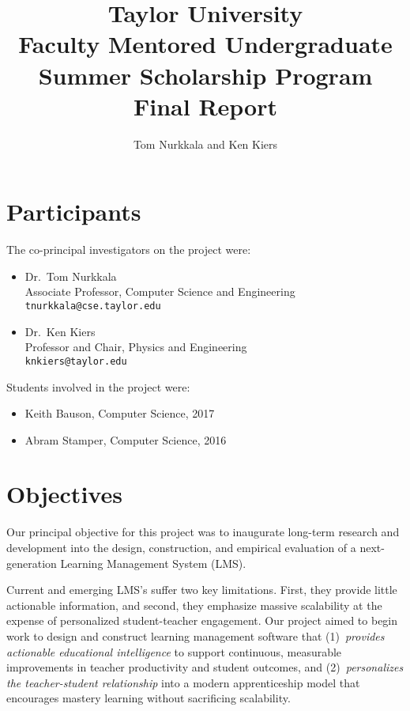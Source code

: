 \documentclass{article}
\title{Taylor University\\
  Faculty Mentored Undergraduate\\
  Summer Scholarship Program\\
  Final Report}
\author{Tom Nurkkala and Ken Kiers}
\begin{document}
\maketitle


\section{Participants}
\label{sec:participants}

The co-principal investigators on the project were:
\begin{itemize}
\item Dr.\ Tom Nurkkala\\
  Associate Professor, Computer Science and Engineering\\
  \texttt{tnurkkala@cse.taylor.edu}
\item Dr.\ Ken Kiers\\
  Professor and Chair, Physics and Engineering\\
  \texttt{knkiers@taylor.edu}
\end{itemize}
Students involved in the project were:
\begin{itemize}
\item Keith Bauson, Computer Science, 2017
\item Abram Stamper, Computer Science, 2016
\end{itemize}

\section{Objectives}
\label{sec:objectives}

Our principal objective for this project was
to inaugurate long-term research and development
into the design, construction, and empirical evaluation
of a next-generation Learning Management System (LMS).

Current and emerging LMS's
suffer two key limitations.
First, they provide little actionable information,
and second, they emphasize massive scalability
at the expense of
personalized student-teacher engagement.
Our project aimed to begin work to
design and construct
learning management software
that
(1)~\emph{provides actionable educational intelligence}
to support continuous, measurable improvements
in teacher productivity and student outcomes, and
(2)~\emph{personalizes the  teacher-student relationship}
into a modern apprenticeship model that
encourages mastery learning without sacrificing scalability.
\end{document}

